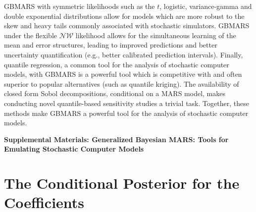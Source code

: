 \documentclass{article} %
\newcommand{\NW}{\mathcal{NW}}
\begin{document}
GBMARS with symmetric likelihoods such as the $t$, logistic, variance-gamma and double exponential distributions allow for models which are more robust to the skew and heavy tails commonly associated with stochastic simulators. GBMARS under the flexible $\NW$ likelihood allows for the simultaneous learning of the mean and error structures, leading to improved predictions and better uncertainty quantification (e.g., better calibrated prediction intervals). Finally, quantile regression, a common tool for the analysis of stochastic computer models, with GBMARS is a powerful tool which is competitive with and often superior to popular alternatives (such as quantile kriging). The availability of closed form Sobol decompositions, conditional on a MARS model, makes conducting novel quantile-based sensitivity studies a trivial task. Together, these methods make GBMARS a powerful tool for the analysis of stochastic computer models. 











\pagebreak
\begin{center}
\textbf{\large Supplemental Materials: Generalized Bayesian MARS: Tools for Emulating Stochastic Computer Models}
\end{center}
\setcounter{equation}{0}
\setcounter{figure}{0}
\setcounter{table}{0}
\setcounter{page}{1}
\setcounter{section}{0}
\makeatletter
\renewcommand{\theequation}{SM\arabic{equation}}
\renewcommand{\thefigure}{SM\arabic{figure}}
\renewcommand{\thesection}{SM\arabic{section}}
\renewcommand{\bibnumfmt}[1]{[SM#1]}
\renewcommand{\citenumfont}[1]{SM#1}

\section{The Conditional Posterior for the Coefficients}
\label{sec:smconditional}
\end{document}
